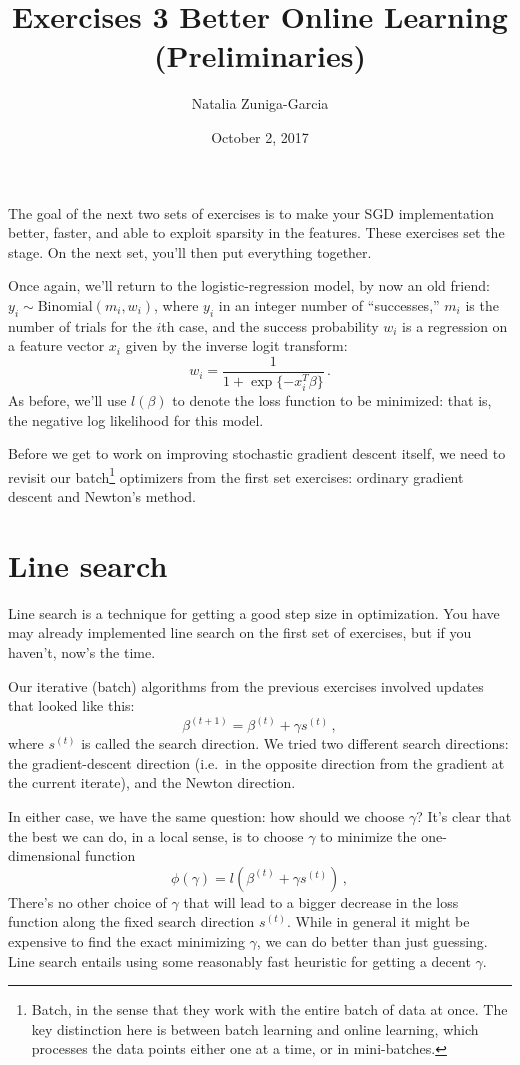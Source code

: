 \documentclass[11 pt]{article}
\author{Natalia Zuniga-Garcia}
\title{Exercises 3 Better Online Learning (Preliminaries)}
\date{October 2, 2017}
\begin{document}
\maketitle

The goal of the next two sets of exercises is to make your SGD implementation better, faster, and able to exploit sparsity in the features.  These exercises set the stage.  On the next set, you'll then put everything together.

Once again, we'll return to the logistic-regression model, by now an old friend: $y_i \sim \mbox{Binomial}(m_i, w_i)$, where $y_i$ in an integer number of ``successes,'' $m_i$ is the number of trials for the $i$th case, and the success probability $w_i$ is a regression on a feature vector $x_i$ given by the inverse logit transform:
$$
w_i = \frac{1}{1 + \exp\{-x_i^T \beta\}} \, .
$$
As before, we'll use $l(\beta)$ to denote the loss function to be minimized: that is, the negative log likelihood for this model.

Before we get to work on improving stochastic gradient descent itself, we need to revisit our batch\footnote{Batch, in the sense that they work with the entire batch of data at once.  The key distinction here is between batch learning and online learning, which processes the data points either one at a time, or in mini-batches.} optimizers from the first set exercises: ordinary gradient descent and Newton's method.

\section{Line search}

Line search is a technique for getting a good step size in optimization.  You have may already implemented line search on the first set of exercises, but if you haven't, now's the time.

Our iterative (batch) algorithms from the previous exercises involved updates that looked like this:
$$
\beta^{(t+1)} = \beta^{(t)} + \gamma s^{(t)} \, ,
$$
where $s^{(t)}$ is called the search direction.  We tried two different search directions: the gradient-descent direction (i.e.~in the opposite direction from the gradient at the current iterate), and the Newton direction.

In either case, we have the same question: how should we choose $\gamma$?  It's clear that the best we can do, in a local sense, is to choose $\gamma$ to minimize the one-dimensional function
$$
\phi(\gamma) = l(\beta^{(t)} + \gamma s^{(t)}) \, ,
$$
There's no other choice of $\gamma$ that will lead to a bigger decrease in the loss function along the fixed search direction $s^{(t)}$.  While in general it might be expensive to find the exact minimizing $\gamma$, we can do better than just guessing.  Line search entails using some reasonably fast heuristic for getting a decent $\gamma$.
\end{document}
